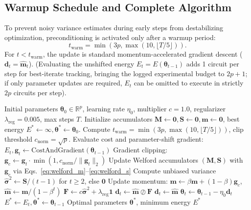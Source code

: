 \documentclass[11pt,a4paper]{article}
\begin{document}
\subsection{Warmup Schedule and Complete Algorithm}
To prevent noisy variance estimates during early steps from destabilizing optimization, preconditioning is activated only after a warmup period:
\begin{equation}
t_{\text{warm}} = \min(3p, \max(10, \lfloor T / 5 \rfloor)).
\label{eq:warmup}
\end{equation}
For $t < t_{\text{warm}}$, the update is standard momentum-accelerated gradient descent ($\mathbf{d}_t = \hat{\mathbf{m}}_t$). (Evaluating the unshifted energy $E_t = E(\boldsymbol{\theta}_{t-1})$ adds 1 circuit per step for best-iterate tracking, bringing the logged experimental budget to $2p+1$; if only parameter updates are required, $E_t$ can be omitted to execute in strictly $2p$ circuits per step).

\begin{algorithm}[H]
\caption{SIGMA-QGD Optimization Algorithm}
\label{alg:sigma_qgd}
\begin{algorithmic}[1]
\REQUIRE Initial parameters $\boldsymbol{\theta}_0 \in \mathbb{R}^p$, learning rate $\eta_0$, multiplier $c=1.0$, regularizer $\lambda_{\text{reg}}=0.005$, max steps $T$.
\STATE Initialize accumulators $\mathbf{M} \leftarrow \mathbf{0}, \mathbf{S} \leftarrow \mathbf{0}, \mathbf{m} \leftarrow \mathbf{0}$, best energy $E^* \leftarrow \infty, \boldsymbol{\theta}^* \leftarrow \boldsymbol{\theta}_0$.
\STATE Compute $t_{\text{warm}} = \min(3p, \max(10, \lfloor T/5 \rfloor))$, clip threshold $c_{\text{norm}} = \sqrt{p}$.
    \STATE Evaluate cost and parameter-shift gradient: $E_t, \mathbf{g}_t \leftarrow \text{CostAndGradient}(\boldsymbol{\theta}_{t-1})$ \hfill {}
    \STATE Gradient clipping: $\mathbf{g}_c \leftarrow \mathbf{g}_t \cdot \min(1, c_{\text{norm}} / \|\mathbf{g}_t\|_2)$
    \STATE Update Welford accumulators $(\mathbf{M}, \mathbf{S})$ with $\mathbf{g}_c$ via Eqs.~\eqref{eq:welford_m}--\eqref{eq:welford_s}
    \STATE Compute unbiased variance $\hat{\boldsymbol{\sigma}}^2 \leftarrow \mathbf{S} / (t-1)$ for $t \ge 2$, else $\mathbf{0}$
    \STATE Update momentum: $\mathbf{m} \leftarrow \beta \mathbf{m} + (1-\beta)\mathbf{g}_c$, $\hat{\mathbf{m}} \leftarrow \mathbf{m} / (1-\beta^t)$
        \STATE $\mathbf{F} \leftarrow c \hat{\boldsymbol{\sigma}}^2 + \lambda_{\text{reg}} \mathbf{1}$
        \STATE $\mathbf{d}_t \leftarrow \hat{\mathbf{m}} \oslash \mathbf{F}$
    \ELSE
        \STATE $\mathbf{d}_t \leftarrow \hat{\mathbf{m}}$
    \ENDIF
    \STATE $\boldsymbol{\theta}_t \leftarrow \boldsymbol{\theta}_{t-1} - \eta_0 \mathbf{d}_t$
        \STATE $E^* \leftarrow E_t, \boldsymbol{\theta}^* \leftarrow \boldsymbol{\theta}_{t-1}$
    \ENDIF
\ENDFOR
\RETURN Optimal parameters $\boldsymbol{\theta}^*$, minimum energy $E^*$
\end{algorithmic}
\end{algorithm}
\end{document}
